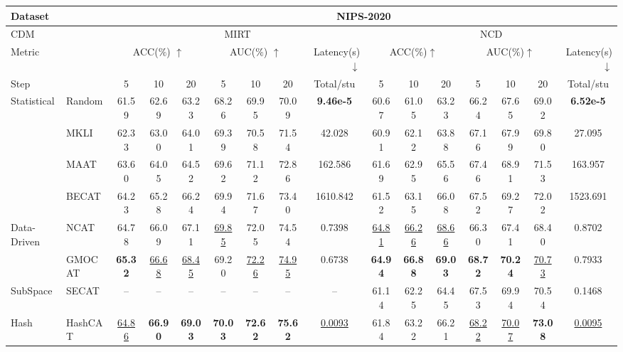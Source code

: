 \begin{table}[!t]
{\begin{tabular}{l l|ccc|ccc|c|ccc|ccc|c}
    \multicolumn{2}{l|}{Dataset} & \multicolumn{14}{c}{NIPS-2020} \\
    \midrule
    \multicolumn{2}{l|}{CDM} & \multicolumn{7}{c|}{MIRT} & \multicolumn{7}{c}{NCD} \\
    \midrule
    \multicolumn{2}{l|}{Metric} & \multicolumn{3}{c|}{ACC($\%$) $\uparrow$} & \multicolumn{3}{c|}{AUC($\%$) $\uparrow$} & \multicolumn{1}{r|}{Latency(s) $\downarrow$} & \multicolumn{3}{c|}{ACC($\%$)$\uparrow$} & \multicolumn{3}{c|}{AUC($\%$)$\uparrow$} & \multicolumn{1}{r}{Latency(s)$\downarrow$} \\
    \midrule
    \multicolumn{2}{l|}{Step} & 5 & 10 & 20 & 5 & 10 & 20 & Total/stu & 5 & 10 & 20 & 5 & 10 & 20 & Total/stu \\
    \midrule
   \multirow{4}[8]{*}{Statistical} & Random 
    & 61.59 & 62.69 & 63.23 & 68.26 & 69.95 & 70.09  & \textbf{9.46e-5} & 60.67  & 61.05  & 63.23  & 66.24  & 67.65  & 69.02 & \textbf{6.52e-5} \\
    \cmidrule{3-16} & MKLI &62.33 & 63.00 & 64.01 & 69.39 & 70.58 & 71.54 & 42.028 & 60.91 & 62.12 & 63.88 & 67.16 & 67.99 & 69.80 & 27.095 \\
    \cmidrule{3-16} & MAAT & 63.60 & 64.05 & 64.52 & 69.62 & 71.12 & 72.86& 162.586 &61.69 & 62.95 & 65.56 & 67.46 & 68.91 & 71.53  &  163.957\\
    \cmidrule{3-16} & BECAT &64.23 & 65.28 & 66.24 & 69.94 & 71.67 & 73.40  & 1610.842 &61.52 & 63.15 & 66.08 & 67.52 & 69.27 & 72.02  & 1523.691 \\
    \midrule
     \multirow{2}{*}[2pt]{\centering Data-Driven}  & NCAT & 64.78 & 66.09 &67.11 &\underline{69.85} &72.05  &74.54  & 0.7398 &\underline{64.81} &\underline{66.26} &\underline{68.66} &66.30 &67.41 &68.40 & 0.8702\\
    \cmidrule{3-16} & GMOCAT & \textbf{65.32} & \underline{66.68} & \underline{68.45} & 69.20 & \underline{72.26} & \underline{74.95} & 0.6738 &\textbf{64.94} &\textbf{66.88} & \textbf{69.03}& \textbf{68.72}&\textbf{70.24} &\underline{70.73} & 0.7933\\
    \midrule
    SubSpace & SECAT & -- &--  & -- & -- &-- & -- & --&  61.14& 62.25& 64.45&67.53 & 69.94& 70.54&  0.1468 \\
    \midrule
    Hash & HashCAT & \cellcolor{gray!25}\underline{64.86} & \cellcolor{gray!25}\textbf{66.90} & \cellcolor{gray!25}\textbf{69.03} & \cellcolor{gray!25}\textbf{70.03} & \cellcolor{gray!25}\textbf{72.62} & \cellcolor{gray!25}\textbf{75.62} & \cellcolor{gray!25}\underline{0.0093} &\cellcolor{gray!25}61.84 & \cellcolor{gray!25}63.22 & \cellcolor{gray!25}66.21 & \cellcolor{gray!25}\underline{68.22} & \cellcolor{gray!25}\underline{70.07} & \cellcolor{gray!25}\textbf{73.08}  & \cellcolor{gray!25}\underline{0.0095} \\

\end{tabular}}
\end{table}
